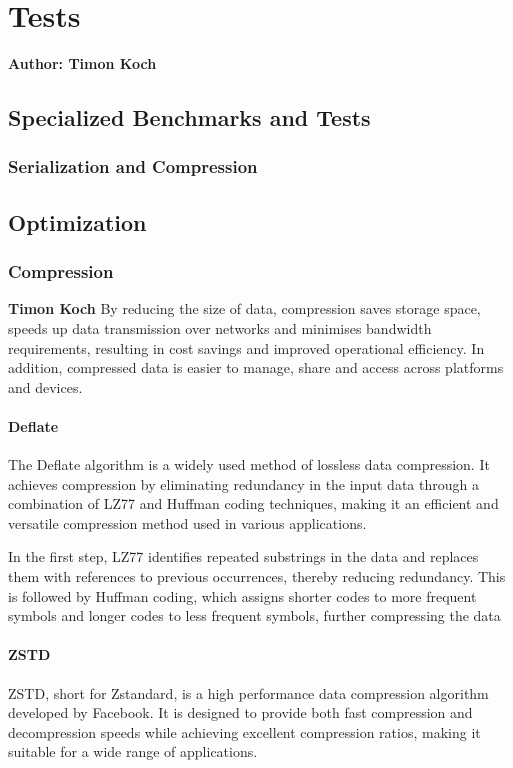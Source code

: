 \chapter{Tests}

\textbf{Author: Timon Koch}

\section{Specialized Benchmarks and Tests}
\subsection{Serialization and Compression}

\section{Optimization}
\subsection{Compression}
\textbf{Timon Koch}
By reducing the size of data, compression saves storage space, speeds up data transmission over networks and minimises bandwidth requirements, resulting in cost savings and improved operational efficiency. In addition, compressed data is easier to manage, share and access across platforms and devices. 

\subsubsection{Deflate}
The Deflate algorithm is a widely used method of lossless data compression. It achieves compression by eliminating redundancy in the input data through a combination of LZ77 and Huffman coding techniques, making it an efficient and versatile compression method used in various applications.

In the first step, LZ77 identifies repeated substrings in the data and replaces them with references to previous occurrences, thereby reducing redundancy. This is followed by Huffman coding, which assigns shorter codes to more frequent symbols and longer codes to less frequent symbols, further compressing the data

\subsubsection{ZSTD}
ZSTD, short for Zstandard, is a high performance data compression algorithm developed by Facebook. It is designed to provide both fast compression and decompression speeds while achieving excellent compression ratios, making it suitable for a wide range of applications.

